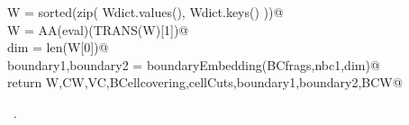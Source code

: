 \documentclass[11pt,oneside]{article}	%
\begin{document}
\begin{flushleft}
\begin{list}{}{}
\mbox{}\verb@   W = sorted(zip( Wdict.values(), Wdict.keys() ))@\\
\mbox{}\verb@   W = AA(eval)(TRANS(W)[1])@\\
\mbox{}\verb@   dim = len(W[0])@\\
\mbox{}\verb@   boundary1,boundary2 = boundaryEmbedding(BCfrags,nbc1,dim)@\\
\mbox{}\verb@   return W,CW,VC,BCellcovering,cellCuts,boundary1,boundary2,BCW@\\
\mbox{}\verb@@{\NWsep}
\end{list}
\vspace{-1ex}
\footnotesize\addtolength{\baselineskip}{-1ex}
\begin{list}{}{\setlength{\itemsep}{-\parsep}\setlength{\itemindent}{-\leftmargin}}
\item \NWtxtMacroRefIn\ .
\end{list}
\end{flushleft}
\end{document}

